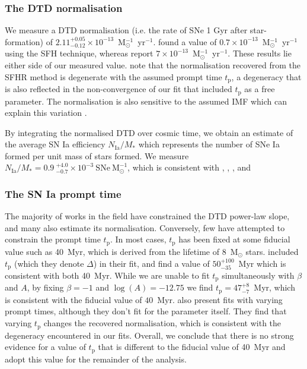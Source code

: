 \documentclass[fleqn,usenatbib]{mnras}
\begin{document}
\subsubsection{The DTD normalisation \label{subsubsec:compare_A}}
We measure a DTD normalisation (i.e. the rate of SNe 1 Gyr after star-formation) of $2.11^{+0.05}_{-0.12} \times 10^{-13}$~M$_{\odot}^{-1}$~yr$^{-1}$. \citet{Graur2013} found a value of $0.7 \times 10^{-13}$~M$_{\odot}^{-1}$~yr$^{-1}$ using the SFH technique, whereas \citet{Heringer2019} report $7 \times 10^{-13}$~M$_{\odot}^{-1}$~yr$^{-1}$. These results lie either side of our measured value. \citet{Heringer2019} note that the normalisation recovered from the SFHR method is degenerate with the assumed prompt time $t_{\mathrm{p}}$, a degeneracy that is also reflected in the non-convergence of our fit that included $t_{\mathrm{p}}$ as a free parameter. The normalisation is also sensitive to the assumed IMF which can explain this variation \citep{Maoz2017}. 

By integrating the normalised DTD over cosmic time, we obtain an estimate of the average SN Ia efficiency $N_{\mathrm{Ia}}/M_*$ which represents the number of SNe Ia formed per unit mass of stars formed. We measure $N_{\mathrm{Ia}}/M_* = 0.9~_{-0.7}^{+4.0} \times 10^{-3}~\mathrm{SNe}~\mathrm{M}_{\odot}^{-1}$, which is consistent with \citet{Graur2011}, \citet{Maoz2011}, \citet{Perrett2012}, and \citet{Graur2013}



\subsubsection{The SN Ia prompt time \label{subsubsec:compare_tp}}

The majority of works in the field have constrained the DTD power-law slope, and many also estimate its normalisation. Conversely, few have attempted to constrain the prompt time $t_{\mathrm{p}}$. In most cases, $t_{\mathrm{p}}$ has been fixed at some fiducial value such as 40~Myr, which is derived from the lifetime of 8~M$_{\odot}$ stars. \citet{Castrillo2020} included $t_{\mathrm{p}}$ (which they denote $\Delta$) in their fit, and find a value of $50_{-35}^{+100}$~Myr which is consistent with both 40~Myr. While we are unable to fit $t_{\mathrm{p}}$ simultaneously with $\beta$ and $A$, by fixing $\beta=-1$ and $\log(A)=-12.75$ we find $t_{\mathrm{p}} =47_{-7}^{+8}$~Myr, which is consistent with the fiducial value of $40$~Myr. \citet{Heringer2019} also present fits with varying prompt times, although they don't fit for the parameter itself. They find that varying $t_{\mathrm{p}}$ changes the recovered normalisation, which is consistent with the degeneracy encountered in our fits. Overall, we conclude that there is no strong evidence for a value of $t_{\mathrm{p}}$ that is different to the fiducial value of 40~Myr and adopt this value for the remainder of the analysis.
\end{document}
